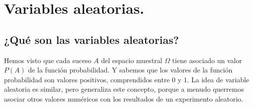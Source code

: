 
\section{Variables aleatorias.}\label{sec:variablesAletorias}

\subsection{¿Qué son las variables aleatorias?}
\label{Cap04:subsec:QueSonVariablesAleatorias}

Hemos visto que cada suceso $A$ del espacio muestral $\Omega$ tiene asociado un valor $P(A)$ de la función probabilidad. Y sabemos que los valores de la función probabilidad son valores positivos, comprendidos entre $0$ y $1$. La idea de variable aleatoria es similar, pero generaliza este concepto, porque a menudo querremos asociar otros valores numéricos con los resultados de un experimento aleatorio.
